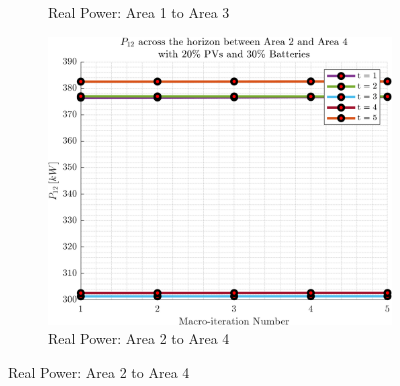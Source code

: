 \documentclass[../../outputs/main.tex]{subfiles}
\begin{document}
\begin{figure}[h!]
\begin{subfigure}[b]{0.3\textwidth}
        \caption{\scriptsize Real Power: Area 1 to Area 3}
        \label{fig:real_power_1_3}
    \end{subfigure}
    \hfill
    \begin{subfigure}[b]{0.3\textwidth}
        \centering
        \includegraphics[width=\textwidth]{../figures/T5-pv20-batt30-genCost/dopf/convergenceCurves/BoundaryRealPower_vs_t_vs_macroItr_T_5_Areas_2_4_genCost_pv_20_batt_30_.png}
        \caption{\scriptsize Real Power: Area 2 to Area 4}
        \label{fig:real_power_2_4}
    \end{subfigure}
    

\end{figure}
\end{document}
